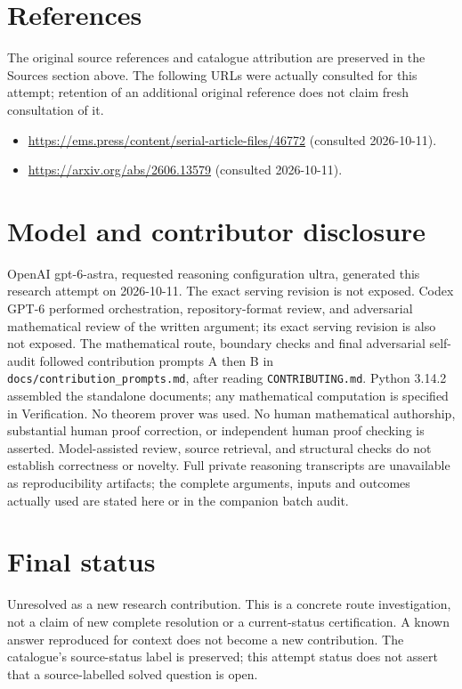 \documentclass[11pt]{article}
\begin{document}
\section{References}
The original source references and catalogue attribution are preserved in the
Sources section above. The following URLs were actually consulted for this attempt;
retention of an additional original reference does not claim fresh consultation of it.
\begin{itemize}
\item \url{https://ems.press/content/serial-article-files/46772} (consulted 2026-10-11). 
\item \url{https://arxiv.org/abs/2606.13579} (consulted 2026-10-11). 
\end{itemize}
\section{Model and contributor disclosure}
OpenAI gpt-6-astra, requested reasoning configuration ultra, generated this research
attempt on 2026-10-11. The exact serving revision is not exposed. Codex GPT-6
performed orchestration, repository-format review, and adversarial mathematical review of the written argument; its exact serving revision
is also not exposed. The mathematical route, boundary checks and final adversarial
self-audit followed contribution prompts A then B in
\texttt{docs/contribution\_prompts.md}, after reading \texttt{CONTRIBUTING.md}.
Python 3.14.2 assembled the standalone documents; any mathematical computation is
specified in Verification. No theorem prover was used. No human mathematical
authorship, substantial human proof correction, or independent human proof checking
is asserted. Model-assisted review, source retrieval, and structural checks do not
establish correctness or novelty. Full private reasoning transcripts are unavailable
as reproducibility artifacts; the complete arguments, inputs and outcomes actually
used are stated here or in the companion batch audit.
\section{Final status}
Unresolved as a new research contribution. This is a concrete route investigation,
not a claim of new complete resolution or a current-status certification. A known
answer reproduced for context does not become a new contribution. The catalogue's
source-status label is preserved; this attempt status does not assert that a
source-labelled solved question is open.
\end{document}
